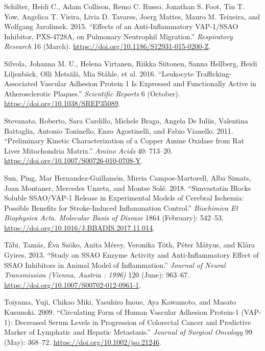 \documentclass[
  letterpaper,
  DIV=11,
  numbers=noendperiod]{scrreprt}
\newlength{\cslhangindent}
\newenvironment{CSLReferences}[2] %
 {\begin{list}{}{%
  \setlength{\itemindent}{0pt}
  \setlength{\leftmargin}{0pt}
  \setlength{\parsep}{0pt}
  \ifodd #1
   \setlength{\leftmargin}{\cslhangindent}
   \setlength{\itemindent}{-1\cslhangindent}
  \fi
  \setlength{\itemsep}{#2\baselineskip}}}
 {\end{list}}
\begin{document}
\begin{CSLReferences}{1}{0}
Schilter, Heidi C., Adam Collison, Remo C. Russo, Jonathan S. Foot, Tin
T. Yow, Angelica T. Vieira, Livia D. Tavares, Joerg Mattes, Mauro M.
Teixeira, and Wolfgang Jarolimek. 2015. {``Effects of an
Anti-Inflammatory VAP-1/SSAO Inhibitor, PXS-4728A, on Pulmonary
Neutrophil Migration.''} \emph{Respiratory Research} 16 (March).
\url{https://doi.org/10.1186/S12931-015-0200-Z}.

Silvola, Johanna M. U., Helena Virtanen, Riikka Siitonen, Sanna
Hellberg, Heidi Liljenbäck, Olli Metsälä, Mia Ståhle, et al. 2016.
{``Leukocyte Trafficking-Associated Vascular Adhesion Protein 1 Is
Expressed and Functionally Active in Atherosclerotic Plaques.''}
\emph{Scientific Reports} 6 (October).
\url{https://doi.org/10.1038/SREP35089}.

Stevanato, Roberto, Sara Cardillo, Michele Braga, Angela De Iuliis,
Valentina Battaglia, Antonio Toninello, Enzo Agostinelli, and Fabio
Vianello. 2011. {``Preliminary Kinetic Characterization of a Copper
Amine Oxidase from Rat Liver Mitochondria Matrix.''} \emph{Amino Acids}
40: 713--20. \url{https://doi.org/10.1007/S00726-010-0708-Y}.

Sun, Ping, Mar Hernandez-Guillamón, Mireia Campos-Martorell, Alba
Simats, Joan Montaner, Mercedes Unzeta, and Montse Solé. 2018.
{``Simvastatin Blocks Soluble SSAO/VAP-1 Release in Experimental Models
of Cerebral Ischemia: Possible Benefits for Stroke-Induced Inflammation
Control.''} \emph{Biochimica Et Biophysica Acta. Molecular Basis of
Disease} 1864 (February): 542--53.
\url{https://doi.org/10.1016/J.BBADIS.2017.11.014}.

Tábi, Tamás, Éva Szöko, Anita Mérey, Veronika Tóth, Péter Mátyus, and
Klára Gyires. 2013. {``Study on SSAO Enzyme Activity and
Anti-Inflammatory Effect of SSAO Inhibitors in Animal Model of
Inflammation.''} \emph{Journal of Neural Transmission (Vienna, Austria :
1996)} 120 (June): 963--67.
\url{https://doi.org/10.1007/S00702-012-0961-1}.

Toiyama, Yuji, Chikao Miki, Yasuhiro Inoue, Aya Kawamoto, and Masato
Kusunoki. 2009. {``Circulating Form of Human Vascular Adhesion Protein-1
(VAP-1): Decreased Serum Levels in Progression of Colorectal Cancer and
Predictive Marker of Lymphatic and Hepatic Metastasis.''} \emph{Journal
of Surgical Oncology} 99 (May): 368--72.
\url{https://doi.org/10.1002/jso.21246}.


\end{CSLReferences}
\end{document}

